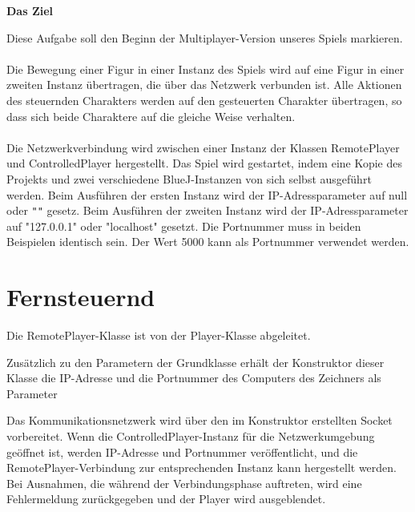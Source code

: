 \documentclass{pi1}
\begin{document}


\textbf{Das Ziel}

Diese Aufgabe soll den Beginn der Multiplayer-Version unseres Spiels markieren.\\
\\Die Bewegung einer Figur in einer Instanz des Spiels wird auf eine Figur in einer zweiten Instanz übertragen, die über das Netzwerk verbunden ist. Alle Aktionen des steuernden Charakters werden auf den gesteuerten Charakter übertragen, so dass sich beide Charaktere auf die gleiche Weise verhalten. \\
\\Die Netzwerkverbindung wird zwischen einer Instanz der Klassen RemotePlayer und ControlledPlayer hergestellt. Das Spiel wird gestartet, indem eine Kopie des Projekts und zwei verschiedene BlueJ-Instanzen von sich selbst ausgeführt werden. Beim Ausführen der ersten Instanz wird der IP-Adressparameter auf null oder \texttt{"}\texttt{"} gesetz. Beim Ausführen der zweiten Instanz wird der IP-Adressparameter auf "127.0.0.1" \texttt{} oder "localhost"\texttt{} gesetzt. Die Portnummer muss in beiden Beispielen identisch sein. Der Wert 5000 kann als Portnummer verwendet werden.

\section{Fernsteuernd}

Die RemotePlayer-Klasse ist von der Player-Klasse abgeleitet.




Zusätzlich zu den Parametern der Grundklasse erhält der Konstruktor dieser Klasse die IP-Adresse und die Portnummer des Computers des Zeichners als Parameter


Das Kommunikationsnetzwerk wird über den im Konstruktor erstellten Socket vorbereitet. Wenn die ControlledPlayer-Instanz für die Netzwerkumgebung geöffnet ist, werden IP-Adresse und Portnummer veröffentlicht, und die RemotePlayer-Verbindung zur entsprechenden Instanz kann hergestellt werden. Bei Ausnahmen, die während der Verbindungsphase auftreten, wird eine Fehlermeldung zurückgegeben und der Player wird ausgeblendet.
\end{document}
